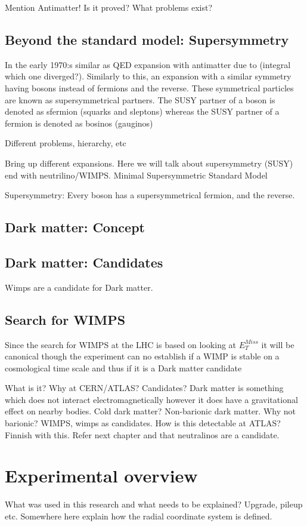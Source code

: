 Mention Antimatter!
Is it proved? What problems exist? 

\subsection{Beyond the standard model: Supersymmetry}
In the early 1970:s similar as QED expansion with antimatter due to (integral which one diverged?). Similarly to this, an expansion with a similar symmetry having bosons instead of fermions and the reverse. These symmetrical particles are known as supersymmetrical partners. The SUSY partner of a boson is denoted as sfermion (squarks and sleptons) whereas the SUSY partner of a fermion is denoted as bosinos (gauginos)

Different problems, hierarchy, etc

Bring up different expansions. Here we will talk about supersymmetry (SUSY) end with neutrilino/WIMPS. 
Minimal Supersymmetric Standard Model

Supersymmetry: Every boson has a supersymmetrical fermion, and the reverse.
\subsection{Dark matter: Concept}
\subsection{Dark matter: Candidates}
Wimps are a candidate for Dark matter.
\subsection{Search for WIMPS}
Since the search for WIMPS at the LHC is based on looking at $E_T^{Miss}$ it will be canonical though the experiment can no establish if a WIMP is stable on a cosmological time scale and thus if it is a Dark matter candidate \citep{CERN-PH-EP-2012-210}


What is it? Why at CERN/ATLAS? Candidates?
Dark matter is something which does not interact electromagnetically however it does have a gravitational effect on nearby bodies.
Cold dark matter?
Non-barionic dark matter. Why not barionic?
WIMPS, wimps as candidates.
How is this detectable at ATLAS? Finnish with this. Refer next chapter and that neutralinos are a candidate.

\newpage
\section{Experimental overview}
What was used in this research and what needs to be explained? Upgrade, pileup etc.
Somewhere here explain how the radial coordinate system is defined.
